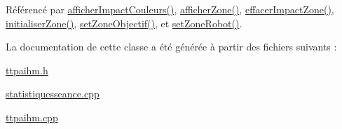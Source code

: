 Référencé par \hyperlink{class_ttpa_ihm_a6e3cd3828ce5d165497e343bdb15cd87}{afficher\+Impact\+Couleurs()}, \hyperlink{class_ttpa_ihm_a3b00f90707811240c7dcfe8ed3dce783}{afficher\+Zone()}, \hyperlink{class_ttpa_ihm_abe9973c64673cdaa067617f9246781d2}{effacer\+Impact\+Zone()}, \hyperlink{class_ttpa_ihm_a5d180e581060b01e028f44ee7bd25290}{initialiser\+Zone()}, \hyperlink{class_ttpa_ihm_a3fd5b5d097f8a52df6fc8dd6d59b1374}{set\+Zone\+Objectif()}, et \hyperlink{class_ttpa_ihm_abda1a93ec09ec404b129e08876faa5f8}{set\+Zone\+Robot()}.



La documentation de cette classe a été générée à partir des fichiers suivants \+:\begin{DoxyCompactItemize}
\item 
\hyperlink{ttpaihm_8h}{ttpaihm.\+h}\item 
\hyperlink{statistiquesseance_8cpp}{statistiquesseance.\+cpp}\item 
\hyperlink{ttpaihm_8cpp}{ttpaihm.\+cpp}\end{DoxyCompactItemize}
